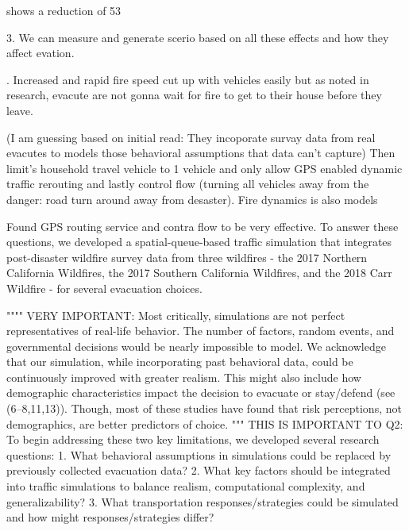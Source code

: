 shows a reduction of 53%



3. We can measure and generate scerio based on all these effects and how they affect evation. 

. Increased and rapid fire speed cut up with vehicles easily but as noted in research, evacute are not gonna wait 
for fire to get to their house before they leave. 




(I am guessing based on initial read: They incoporate survay data from real evacutes to models those behavioral assumptions that data can't capture)
Then limit's household travel vehicle to 1 vehicle and only allow GPS enabled dynamic traffic rerouting and lastly 
control flow (turning all vehicles away from the danger: road turn around away from desaster). Fire dynamics is also models

Found GPS routing service and contra flow to be very effective. 
To answer these questions, we developed a spatial-queue-based traffic simulation that integrates post-disaster wildfire survey data from three wildfires - the 2017 Northern California Wildfires, the 2017 Southern California Wildfires, and the 2018 Carr Wildfire - for several evacuation choices.

""""
VERY IMPORTANT:
Most critically, simulations are not perfect representatives of real-life behavior. The number of factors, random events, and governmental decisions would be nearly impossible to model. We acknowledge that our simulation, while incorporating past behavioral data, could be continuously improved with greater realism. This might also include how demographic characteristics impact the decision to evacuate or stay/defend (see (6–8,11,13)). Though, most of these studies have found that risk perceptions, not demographics, are better predictors of choice.
"""
THIS IS IMPORTANT TO Q2: 
To begin addressing these two key limitations, we developed several research questions:
1. What behavioral assumptions in simulations could be replaced by previously collected evacuation data?
2. What key factors should be integrated into traffic simulations to balance realism, computational complexity, and generalizability?
3. What transportation responses/strategies could be simulated and how might responses/strategies differ?


